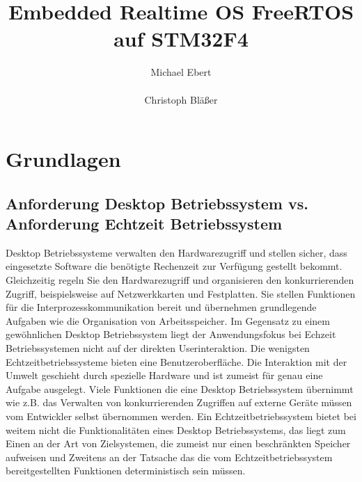 \documentclass[ngerman]{seminarvorlage}
\begin{document}
\title{Embedded Realtime OS FreeRTOS auf STM32F4}
\author{
  \alignauthor Michael Ebert\\
		\\
  \alignauthor Christoph Bläßer\\
}

\maketitle


\section{Grundlagen}
\subsection{Anforderung Desktop Betriebssystem vs. Anforderung Echtzeit Betriebssystem}
Desktop Betriebssysteme verwalten den Hardwarezugriff und stellen sicher, dass eingesetzte Software die benötigte Rechenzeit zur Verfügung gestellt bekommt. Gleichzeitig regeln Sie den Hardwarezugriff und organisieren den konkurrierenden Zugriff, beispielsweise auf Netzwerkkarten und Festplatten. Sie stellen Funktionen für die Interprozesskommunikation bereit und übernehmen grundlegende Aufgaben wie die Organisation von Arbeitsspeicher. Im Gegensatz zu einem gewöhnlichen Desktop Betriebssystem liegt der Anwendungsfokus bei Echzeit Betriebssystemen nicht auf der direkten Userinteraktion. Die wenigsten Echtzeitbetriebssysteme bieten eine Benutzeroberfläche. Die Interaktion mit der Umwelt geschieht durch spezielle Hardware und ist zumeist für genau eine Aufgabe ausgelegt. Viele Funktionen die eine Desktop Betriebssystem übernimmt wie z.B. das Verwalten von konkurrierenden Zugriffen auf externe Geräte müssen vom Entwickler selbst übernommen werden. Ein Echtzeitbetriebssystem bietet bei weitem nicht die Funktionalitäten eines Desktop Betriebssystems, das liegt zum Einen an der Art von Zielsystemen, die zumeist nur einen beschränkten Speicher aufweisen und Zweitens an der Tatsache das die vom Echtzeitbetriebssystem bereitgestellten Funktionen deterministisch sein müssen.   
\end{document}
